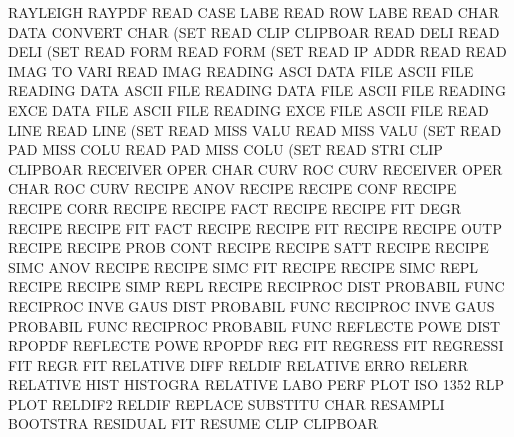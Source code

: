 RAYLEIGH                                RAYPDF
READ     CASE LABE                      READ     ROW  LABE
READ     CHAR DATA                      CONVERT  CHAR (SET
READ     CLIP                           CLIPBOAR
READ     DELI                           READ     DELI (SET
READ     FORM                           READ     FORM (SET
READ     IP   ADDR                      READ
READ     IMAG TO   VARI                 READ     IMAG
READING  ASCI DATA FILE                 ASCII    FILE
READING  DATA                           ASCII    FILE
READING  DATA FILE                      ASCII    FILE
READING  EXCE DATA FILE                 ASCII    FILE
READING  EXCE FILE                      ASCII    FILE
READ     LINE                           READ     LINE (SET
READ     MISS VALU                      READ     MISS VALU (SET
READ     PAD  MISS COLU                 READ     PAD  MISS COLU (SET
READ     STRI CLIP                      CLIPBOAR
RECEIVER OPER CHAR CURV                 ROC      CURV
RECEIVER OPER CHAR                      ROC      CURV
RECIPE   ANOV                           RECIPE
RECIPE   CONF                           RECIPE
RECIPE   CORR                           RECIPE
RECIPE   FACT                           RECIPE
RECIPE   FIT  DEGR                      RECIPE
RECIPE   FIT  FACT                      RECIPE
RECIPE   FIT                            RECIPE
RECIPE   OUTP                           RECIPE
RECIPE   PROB CONT                      RECIPE
RECIPE   SATT                           RECIPE
RECIPE   SIMC ANOV                      RECIPE
RECIPE   SIMC FIT                       RECIPE
RECIPE   SIMC REPL                      RECIPE
RECIPE   SIMP REPL                      RECIPE
RECIPROC DIST                           PROBABIL FUNC
RECIPROC INVE GAUS DIST                 PROBABIL FUNC
RECIPROC INVE GAUS                      PROBABIL FUNC
RECIPROC                                PROBABIL FUNC
REFLECTE POWE DIST                      RPOPDF
REFLECTE POWE                           RPOPDF
REG                                     FIT
REGRESS                                 FIT
REGRESSI                                FIT
REGR                                    FIT
RELATIVE DIFF                           RELDIF
RELATIVE ERRO                           RELERR
RELATIVE HIST                           HISTOGRA
RELATIVE LABO PERF PLOT                 ISO      1352 RLP  PLOT
RELDIF2                                 RELDIF
REPLACE                                 SUBSTITU CHAR
RESAMPLI                                BOOTSTRA
RESIDUAL                                FIT
RESUME   CLIP                           CLIPBOAR
